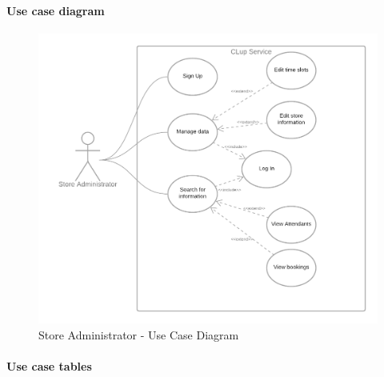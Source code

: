 \documentclass[table, 12pt]{article}
\begin{document}
\paragraph{Use case diagram}
\begin{figure}[H]
    \begin{center}
        \includegraphics[width=\textwidth]{assets/Use-Case-Diagrams/use_case_diagram_store_manager.png}
        \caption{Store Administrator - Use Case Diagram}
    \end{center}
\end{figure}

\newpage
\paragraph{Use case tables}
\end{document}
